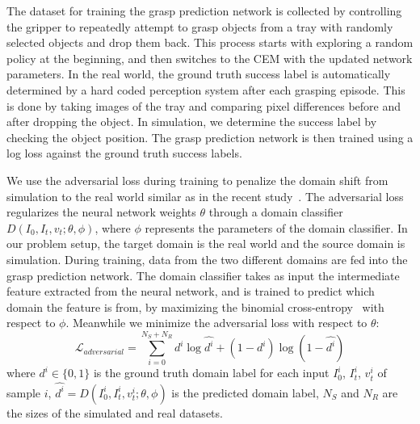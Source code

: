 \documentclass[letterpaper, 10 pt, conference]{ieeeconf}  %
\begin{document}
The dataset for training the grasp prediction network is collected by controlling the gripper to repeatedly attempt to grasp objects from a tray with randomly selected objects and drop them back. This process starts with exploring a random policy at the beginning, and then switches to the CEM with the updated network parameters. In the real world, the ground truth success label is automatically determined by a hard coded perception system after each grasping episode. This is done by taking images of the tray and comparing pixel differences before and after dropping the object. In simulation, we determine the success label by checking the object position. The grasp prediction network is then trained using a log loss against the ground truth success labels.

We use the adversarial loss \cite{ganin2016domain} during training to penalize the domain shift from simulation to the real world similar as in the recent study~\cite{bousmalis-2018}. The adversarial loss regularizes the neural network weights $\theta$ through a domain classifier $D(I_0, I_t, v_t; \theta, \phi)$, where $\phi$ represents the parameters of the domain classifier. In our problem setup, the target domain is the real world and the source domain is simulation. During training, data from the two different domains are fed into the grasp prediction network. The domain classifier takes as input the intermediate feature extracted from the neural network, and is trained to predict which domain the feature is from, by maximizing the binomial cross-entropy~\cite{ganin2016domain} with respect to $\phi$. Meanwhile we minimize the adversarial loss with respect to $\theta$: 
\begin{equation}
    \mathcal{L}_{adversarial} = \sum_{i = 0}^{N_S + N_R} d^i \log \hat{d^i} + (1 - d^i) \log (1 - \hat{d^i})
\end{equation}
where $d^i \in \{0, 1\}$ is the ground truth domain label for each input $I_0^i$, $I_t^i$, $v_t^i$ of sample $i$, $\hat{d^i} = D(I_0^i, I_t^i, v_t^i; \theta, \phi)$ is the predicted domain label, $N_S$ and $N_R$ are the sizes of the simulated and real datasets.

\end{document}
